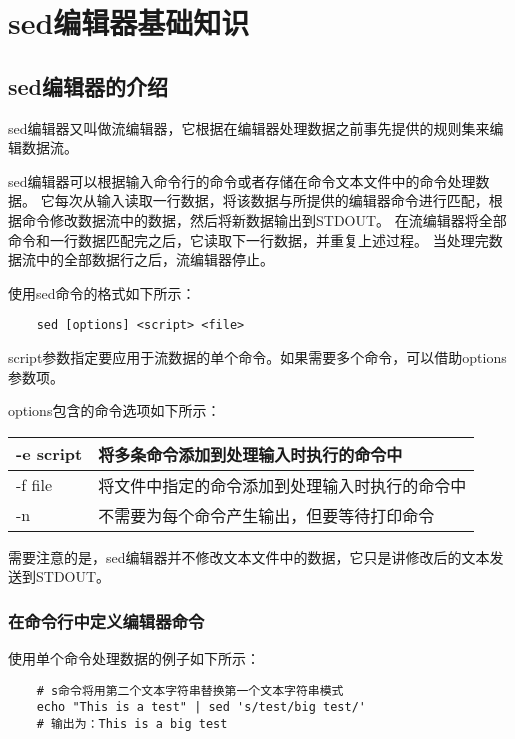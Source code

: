 \documentclass[a4paper,left=2.5cm,right=2.5cm,11pt]{article}
\begin{document}
\tableofcontents

\clearpage

\section{sed编辑器基础知识}
\subsection{sed编辑器的介绍}
	sed编辑器又叫做流编辑器，它根据在编辑器处理数据之前事先提供的规则集来编辑数据流。\par

	sed编辑器可以根据输入命令行的命令或者存储在命令文本文件中的命令处理数据。
	它每次从输入读取一行数据，将该数据与所提供的编辑器命令进行匹配，根据命令修改数据流中的数据，然后将新数据输出到STDOUT。
	在流编辑器将全部命令和一行数据匹配完之后，它读取下一行数据，并重复上述过程。
	当处理完数据流中的全部数据行之后，流编辑器停止。\par

	使用sed命令的格式如下所示：
	\begin{lstlisting}
	sed [options] <script> <file>
	\end{lstlisting}

	script参数指定要应用于流数据的单个命令。如果需要多个命令，可以借助options参数项。\par

	options包含的命令选项如下所示：
	\begin{longtable}{p{2cm}p{7cm}}
	\hline
	-e script & 将多条命令添加到处理输入时执行的命令中 \\
	\hline
	-f file & 将文件中指定的命令添加到处理输入时执行的命令中 \\
	\hline
	-n & 不需要为每个命令产生输出，但要等待打印命令 \\
	\hline
	\end{longtable}

	需要注意的是，sed编辑器并不修改文本文件中的数据，它只是讲修改后的文本发送到STDOUT。

\subsubsection{在命令行中定义编辑器命令}
	使用单个命令处理数据的例子如下所示：
	\begin{lstlisting}
	# s命令将用第二个文本字符串替换第一个文本字符串模式
	echo "This is a test" | sed 's/test/big test/'
	# 输出为：This is a big test
	\end{lstlisting}
\end{document}
